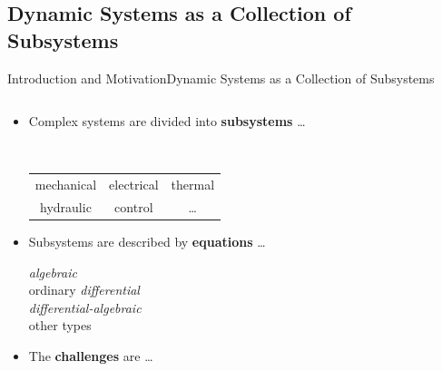 \subsection{Dynamic Systems as a Collection of Subsystems}

\begin{frame}{Introduction and Motivation}{Dynamic Systems as a Collection of Subsystems}
  \begin{columns}
    \begin{column}[c]{0.6\textwidth}
      \begin{itemize}
        \item<1-> Complex systems are divided into \textbf{subsystems} \dots \\
        \begin{small}
          \quad\, \begin{tabular}{ccc}
            \raisebox{-1pt}{\scalebox{0.8}{\textcolor{fg_sl_color}{\faCogs}}} mechanical &
            \raisebox{-1pt}{\scalebox{0.8}{\textcolor{fg_sl_color}{\faBolt}}} electrical &
            \raisebox{-1pt}{\scalebox{0.8}{\textcolor{fg_sl_color}{\faFire}}} thermal \\
            \raisebox{-1pt}{\scalebox{0.8}{\textcolor{fg_sl_color}{\faOilCan}}} hydraulic &
            \raisebox{-1pt}{\scalebox{0.8}{\textcolor{fg_sl_color}{\faWaveSquare}}} control & \dots
          \end{tabular}
        \end{small}
        \item<3-> Subsystems are described by \textbf{equations} \dots \\
        \begin{small}
          \qquad \emph{algebraic} \\
          \qquad ordinary \emph{differential} \\
          \qquad \emph{differential-algebraic} \\
          \qquad other types
        \end{small}
        \item<4-> The \textbf{challenges} are \dots {}
      \end{itemize}
    \end{column}
    \begin{column}[c]{0.4\textwidth}
      \centering
    \end{column}
  \end{columns}
\end{frame}

